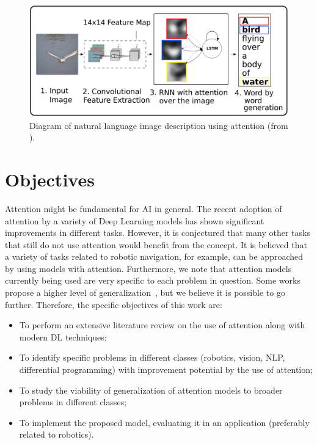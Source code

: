 \documentclass[English]{style/ic-tese-v3}
\begin{document}
\begin{figure}
\begin{center}
	\includegraphics[width=1.0\linewidth]{./img/img_captioning.png}
\caption{
    Diagram of natural language image description using attention
    (from \cite{ref:img-captioning}).
}
\label{fig:description}
\end{center}
\end{figure}

\section{Objectives}
Attention might be fundamental for AI in general.
The recent adoption of attention by a variety of Deep Learning models
has shown significant improvements in different tasks.
However, it is conjectured that many other tasks that still do not use
attention would benefit from the concept.
It is believed that a variety of tasks related to robotic navigation,
for example, can be approached by using models with attention.
Furthermore, we note that attention models currently being used
are very specific to each problem in question.
Some works propose a higher level of generalization~\cite{ref:recurr-models},
but we believe it is possible to go further.
Therefore, the specific objectives of this work are:
\begin{itemize}
    \item To perform an extensive literature review on the use of attention
        along with modern DL techniques;
    \item To identify specific problems in different classes
        (robotics, vision, NLP, differential programming) with
        improvement potential by the use of attention;
    \item To study the viability of generalization of attention models
        to broader problems in different classes;
    \item To implement the proposed model, evaluating it in an
        application (preferably related to robotics).
\end{itemize}
\end{document}
